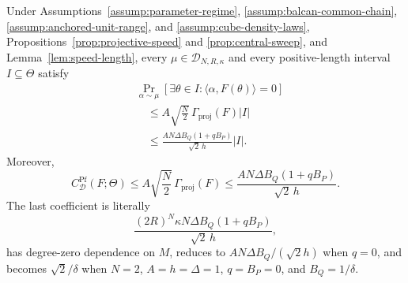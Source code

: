 \begin{proposition}
\label{prop:central-rate}
Under Assumptions~\ref{assump:parameter-regime},
\ref{assump:balcan-common-chain},
\ref{assump:anchored-unit-range}, and
\ref{assump:cube-density-laws}, Propositions~\ref{prop:projective-speed} and
\ref{prop:central-sweep}, and Lemma~\ref{lem:speed-length}, every
$\mu\in\mathcal D_{N,R,\kappa}$ and every positive-length interval
$I\subseteq\Theta$ satisfy
\[
\begin{aligned}
&\Pr_{\alpha\sim\mu}
[\exists\theta\in I:\langle\alpha,F(\theta)\rangle=0]\\
&\quad\leq A\sqrt{\frac N2}\,\Gamma_{\mathrm{proj}}(F)|I|\\
&\quad\leq
\frac{AN\Delta B_Q(1+qB_P)}{\sqrt2\,h}|I|.
\end{aligned}
\tag{A.15}
\]
Moreover,
\[
C^{\mathrm{Pf}}_{\mathcal D}(F;\Theta)
\leq A\sqrt{\frac N2}\,\Gamma_{\mathrm{proj}}(F)
\leq\frac{AN\Delta B_Q(1+qB_P)}{\sqrt2\,h}.
\tag{A.16}
\]
The last coefficient is literally
\[
\frac{(2R)^N\kappa N\Delta B_Q(1+qB_P)}{\sqrt2\,h},
\tag{A.17}
\]
has degree-zero dependence on $M$, reduces to
$AN\Delta B_Q/(\sqrt2 h)$ when $q=0$, and becomes
$\sqrt2/\delta$ when
$N=2$, $A=h=\Delta=1$, $q=B_P=0$, and $B_Q=1/\delta$.
\end{proposition}

